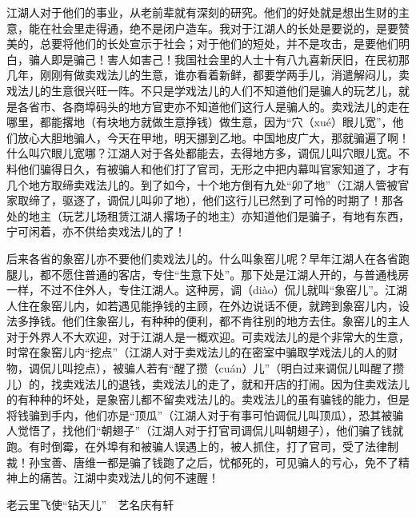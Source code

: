 \documentclass[12pt,UTF8]{ctexbook}
\begin{document}
江湖人对于他们的事业，从老前辈就有深刻的研究。他们的好处就是想出生财的主意，能在社会里走得通，绝不是闭户造车。我对于江湖人的长处是要说的，是要赞美的，总要将他们的长处宣示于社会；对于他们的短处，并不是攻击，是要他们明白，骗人即是骗己！害人如害己！我国社会里的人士十有八九喜新厌旧，在民初那几年，刚刚有做卖戏法儿的生意，谁亦看着新鲜，都要学两手儿，消遣解闷儿，卖戏法儿的生意很兴旺一阵。不只是学戏法儿的人们不知道他们是骗人的玩艺儿，就是各省市、各商埠码头的地方官吏亦不知道他们这行人是骗人的。卖戏法儿的走在哪里，都能撂地（有块地方就做生意挣钱）做生意，因为“穴（xué）眼儿宽”，他们放心大胆地骗人，今天在甲地，明天挪到乙地。中国地皮广大，那就骗遍了啊！什么叫穴眼儿宽哪？江湖人对于各处都能去，去得地方多，调侃儿叫穴眼儿宽。不料他们骗得日久，有被骗人和他们打了官司，无形之中把内幕叫官家知道了，才有几个地方取缔卖戏法儿的。到了如今，十个地方倒有九处“卯了地”（江湖人管被官家取缔了，驱逐了，调侃儿叫卯了地），他们这行儿已然到了可怜的时期了！那各处的地主（玩艺儿场租赁江湖人撂场子的地主）亦知道他们是骗子，有地有东西，宁可闲着，亦不供给卖戏法儿的了！

后来各省的象窑儿亦不要他们卖戏法儿的。什么叫象窑儿呢？早年江湖人在各省跑腿儿，都不愿住普通的客店，专住“生意下处”。那下处是江湖人开的，与普通栈房一样，不过不住外人，专住江湖人。这种房，调（diào）侃儿就叫“象窑儿”。江湖人住在象窑儿内，如若遇见能挣钱的主顾，在外边说话不便，就跨到象窑儿内，设法多挣钱。他们住象窑儿，有种种的便利，都不肯往别的地方去住。象窑儿的主人对于外界人不大欢迎，对于江湖人是一概欢迎。可卖戏法儿的是个非常大的生意，时常在象窑儿内“挖点”（江湖人对于卖戏法儿的在密室中骗取学戏法儿的人的财物，调侃儿叫挖点），被骗人若有“醒了攒（cuán）儿”（明白过来调侃儿叫醒了攒儿）的，找卖戏法儿的退钱，卖戏法儿的走了，就和开店的打闹。因为住卖戏法儿的有种种的坏处，是象窑儿都不留卖戏法儿的。卖戏法儿的虽有骗钱的能力，但是将钱骗到手内，他们亦是“顶瓜”（江湖人对于有事可怕调侃儿叫顶瓜），恐其被骗人觉悟了，找他们“朝翅子”（江湖人对于打官司调侃儿叫朝翅子），他们骗了钱就跑。有时倒霉，在外埠有和被骗人误遇上的，被人抓住，打了官司，受了法律制裁！孙宝善、唐维一都是骗了钱跑了之后，忧郁死的，可见骗人的亏心，免不了精神上的痛苦。江湖中卖戏法儿的何不速醒！





老云里飞使“钻天儿”　艺名庆有轩
\end{document}
